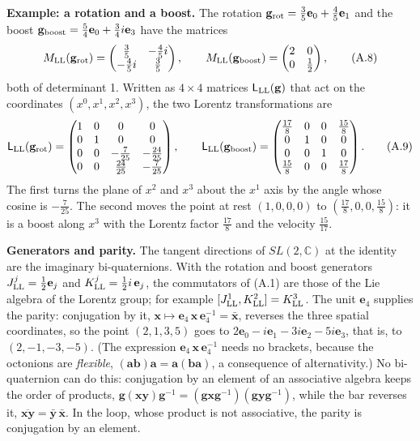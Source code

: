 \documentclass[
  10pt,
]{article}
\begin{document}
\textbf{Example: a rotation and a boost.} The rotation
\(\mathbf g_{\rm rot}=\tfrac{3}{5}\mathbf e_{0}+\tfrac{4}{5}\mathbf e_{1}\)
and the boost
\(\mathbf g_{\rm boost}=\tfrac{5}{4}\mathbf e_{0}+\tfrac{3}{4}i\mathbf e_{3}\)
have the matrices
\[M_{\rm LL}(\mathbf g_{\rm rot})=\begin{pmatrix}\tfrac{3}{5}&-\tfrac{4}{5}i\\-\tfrac{4}{5}i&\tfrac{3}{5}\end{pmatrix},\qquad M_{\rm LL}(\mathbf g_{\rm boost})=\begin{pmatrix}2&0\\0&\tfrac{1}{2}\end{pmatrix},\tag{A.8}\]
both of determinant 1. Written as \(4\times4\) matrices
\(\mathsf L_{\rm LL}(\mathbf g)\) that act on the coordinates
\((x^0,x^1,x^2,x^3)\), the two Lorentz transformations are
\[\mathsf L_{\rm LL}(\mathbf g_{\rm rot})=\begin{pmatrix}1&0&0&0\\0&1&0&0\\0&0&-\tfrac{7}{25}&-\tfrac{24}{25}\\0&0&\tfrac{24}{25}&-\tfrac{7}{25}\end{pmatrix},\qquad\mathsf L_{\rm LL}(\mathbf g_{\rm boost})=\begin{pmatrix}\tfrac{17}{8}&0&0&\tfrac{15}{8}\\0&1&0&0\\0&0&1&0\\\tfrac{15}{8}&0&0&\tfrac{17}{8}\end{pmatrix}.\tag{A.9}\]
The first turns the plane of \(x^2\) and \(x^3\) about the \(x^1\) axis
by the angle whose cosine is \(-\tfrac7{25}\). The second moves the
point at rest \((1,0,0,0)\) to \((\tfrac{17}{8},0,0,\tfrac{15}{8})\): it
is a boost along \(x^3\) with the Lorentz factor \(\tfrac{17}8\) and the
velocity \(\tfrac{15}{17}\).

\textbf{Generators and parity.} The tangent directions of
\(SL(2,\mathbb C)\) at the identity are the imaginary bi-quaternions.
With the rotation and boost generators
\(J^j_{\rm LL}=\tfrac12\mathbf e_j\) and
\(K^j_{\rm LL}=\tfrac12i\,\mathbf e_j\), the commutators of (A.1) are
those of the Lie algebra of the Lorentz group; for example
\([J^1_{\rm LL},K^2_{\rm LL}]=K^3_{\rm LL}\). The unit \(\mathbf e_4\)
supplies the parity: conjugation by it,
\(\mathbf x\mapsto\mathbf e_4\,\mathbf x\,\mathbf e_4^{-1}=\bar{\mathbf x}\),
reverses the three spatial coordinates, so the point \((2,1,3,5)\) goes
to \(2\mathbf e_{0}-i\mathbf e_{1}-3i\mathbf e_{2}-5i\mathbf e_{3}\),
that is, to \((2,-1,-3,-5)\). (The expression
\(\mathbf e_4\,\mathbf x\,\mathbf e_4^{-1}\) needs no brackets, because
the octonions are \emph{flexible},
\((\mathbf a\mathbf b)\mathbf a=\mathbf a(\mathbf b\mathbf a)\), a
consequence of alternativity.) No bi-quaternion can do this: conjugation
by an element of an associative algebra keeps the order of products,
\(\mathbf g(\mathbf x\mathbf y)\mathbf g^{-1}=(\mathbf g\mathbf x\mathbf g^{-1})(\mathbf g\mathbf y\mathbf g^{-1})\),
while the bar reverses it,
\(\overline{\mathbf x\mathbf y}=\bar{\mathbf y}\,\bar{\mathbf x}\). In
the loop, whose product is not associative, the parity is conjugation by
an element.
\end{document}
